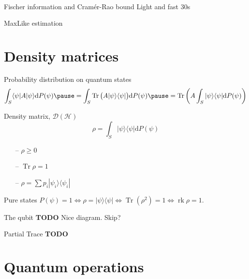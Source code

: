 \documentclass{beamer}
\newcommand{\TODO}{\textbf{TODO}}
\newcommand{\ket}[1]{|#1\rangle}
\newcommand{\bra}[1]{\langle#1|}
\newcommand{\dd}{\mathrm{d}}
\renewcommand{\geq}{\geqslant}
\DeclareMathOperator{\Tr}{Tr}
\DeclareMathOperator{\rk}{rk}
\begin{document}
\begin{frame}{Fischer information and Cramér-Rao bound}
  Light and fast 30s
\end{frame}

\begin{frame}{MaxLike estimation}
\end{frame}



\section{Density matrices}

\begin{frame}{Probability distribution on quantum states}
  \[\int_S \bra \psi A\ket \psi \dd P(\psi)\pause = \int_S \Tr\big(A\ket \psi \bra \psi\big) \dd
    P(\psi) \pause = \Tr\left(A \int_S\ket \psi \bra \psi \dd P(\psi) \right)\]
  \pause{}
  \begin{block}{Density matrix, $\mathcal{D}(\mathcal{H})$}
    \[\rho = \int_S\ket \psi \bra \psi \dd P(\psi)\]
  \end{block}

  \pause{}

\begin{itemize}
  \item[--] $\rho \geq 0$
    \pause{}
  \item[--] $\Tr \rho = 1$
    \pause{}
  \item[--] $\rho = \sum p_i \ket {\psi_i} \bra{\psi_i}$
\end{itemize}

  \pause{} \vspace{3mm}

\begin{block}{Pure states}
  $P(\psi) = 1 \iff \rho = \ket \psi \bra \psi \iff \Tr(\rho^2) = 1 \iff \rk
  \rho = 1$.
\end{block}
\end{frame}

\begin{frame}{The qubit}
  \TODO{} Nice diagram. Skip?
\end{frame}

\begin{frame}{Partial Trace}
  \TODO{}
\end{frame}



\section{Quantum operations}
\end{document}
